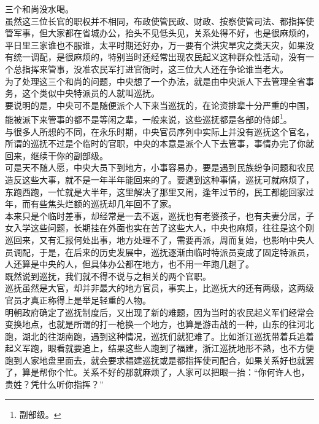 \begin{multicols}{\theparacolNo}
三个和尚没水喝。\\

虽然这三位长官的职权并不相同，布政使管民政、财政、按察使管司法、都指挥使管军事，但大家都在省城办公，抬头不见低头见，关系处得不好，也是很麻烦的，平日里三家谁也不服谁，太平时期还好办，万一要有个洪灾旱灾之类天灾，如果没有统一调配，是很麻烦的，特别当时还经常出现农民起义这种群众性活动，没有一个总指挥来管事，没准农民军打进官衙时，这三位大人还在争论谁当老大。\\

为了处理这三个和尚的问题，中央想了一个办法，就是由中央派人下去管理全省事务，这个类似中央特派员的人就叫巡抚。\\

要说明的是，中央可不是随便派个人下来当巡抚的，在论资排辈十分严重的中国，能被派下来管事的都不是等闲之辈，一般来说，这些巡抚都是各部的侍郎\footnote{副部级。}。\\

与很多人所想的不同，在永乐时期，中央官员序列中实际上并没有巡抚这个官名，所谓的巡抚不过是个临时的官职，中央的本意是派个人下去管事，事情办完了你就回来，继续干你的副部级。\\

可是天不随人愿，中央大员下到地方，小事容易办，要是遇到民族纷争问题和农民造反这些大事，就不是一年半年能回来的了。要遇到这种事情，巡抚可就麻烦了，东跑西跑，一忙就是大半年，这里解决了那里又闹，逢年过节的，民工都能回家过年，而有些焦头烂额的巡抚却几年回不了家。\\

本来只是个临时差事，却经常是一去不返，巡抚也有老婆孩子，也有夫妻分居，子女入学这些问题，长期挂在外面也实在苦了这些大人，中央也麻烦，往往是这个刚巡回来，又有汇报何处出事，地方处理不了，需要再派，周而复始，也影响中央人员调配，于是，在后来的历史发展中，巡抚逐渐由临时特派员变成了固定特派员，人还算是中央的人，但具体办公都在地方，也不用一年跑几趟了。\\

既然说到巡抚，我们就不得不说与之相关的两个官职。\\

巡抚虽然是大官，却并非最大的地方官员，事实上，比巡抚大的还有两级，这两级官员才真正称得上是举足轻重的人物。\\

明朝政府确定了巡抚制度后，又出现了新的难题，因为当时的农民起义军们经常会变换地点，也就是所谓的打一枪换一个地方，也算是游击战的一种，山东的往河北跑，湖北的往湖南跑，遇到这种情况，巡抚们就犯难了。比如浙江巡抚带着兵追着起义军跑，眼看就要追上，结果这些人跑到了福建，浙江巡抚地形不熟，也不方便跑到人家地盘里面去，就会要求福建巡抚或是都指挥使司配合，如果关系好也就罢了，算是帮你个忙。关系不好的那就麻烦了，人家可以把眼一抬：“你何许人也，贵姓？凭什么听你指挥？”\\


\end{multicols}
